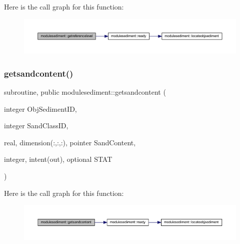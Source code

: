 Here is the call graph for this function\+:\nopagebreak
\begin{figure}[H]
\begin{center}
\leavevmode
\includegraphics[width=350pt]{namespacemodulesediment_ad8d5d321d848d9df2cc84a9c53bc5ec1_cgraph}
\end{center}
\end{figure}
\mbox{\label{namespacemodulesediment_ab155d890675462bce376e88c657ed0bb}} 
\subsubsection{\texorpdfstring{getsandcontent()}{getsandcontent()}}
{\footnotesize\ttfamily subroutine, public modulesediment\+::getsandcontent (\begin{DoxyParamCaption}\item[{integer}]{Obj\+Sediment\+ID,  }\item[{integer}]{Sand\+Class\+ID,  }\item[{real, dimension(\+:,\+:,\+:), pointer}]{Sand\+Content,  }\item[{integer, intent(out), optional}]{S\+T\+AT }\end{DoxyParamCaption})}

Here is the call graph for this function\+:\nopagebreak
\begin{figure}[H]
\begin{center}
\leavevmode
\includegraphics[width=350pt]{namespacemodulesediment_ab155d890675462bce376e88c657ed0bb_cgraph}
\end{center}
\end{figure}
\mbox{\label{namespacemodulesediment_a7bb4238fb2af1033061fd9f1fdf674dc}} 
